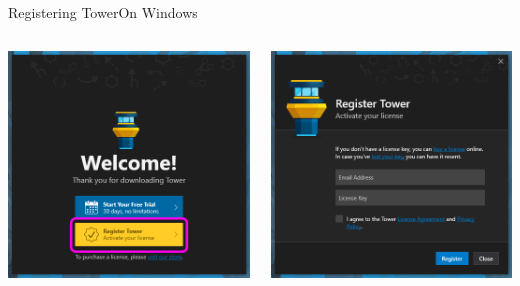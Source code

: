 \documentclass[aspectratio=169]{beamer}
\begin{document}
\begin{frame}{Registering Tower}{On Windows}
    \begin{columns}
        \begin{column}{0.5\textwidth}
            \centering
            \includegraphics[width=\linewidth]{tower_welcome.png}
        \end{column}
        \begin{column}{0.5\textwidth}
            \centering
            \includegraphics[width=\linewidth]{tower_register.png}
        \end{column}
    \end{columns}
\end{frame}
\end{document}
